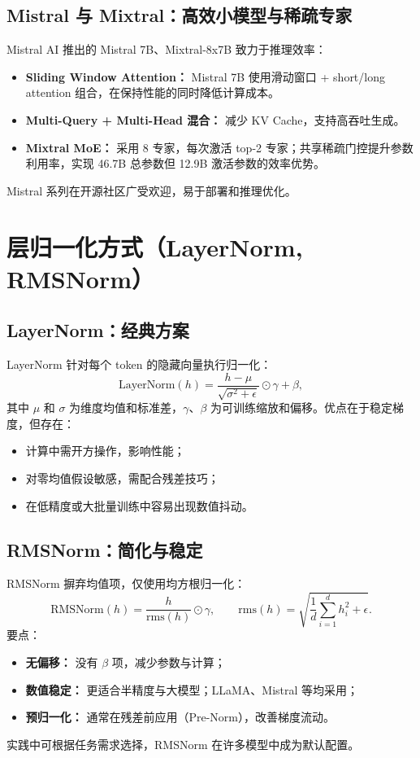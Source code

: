 \documentclass[UTF8,zihao=-4]{ctexart}
\begin{document}
\subsection{Mistral 与 Mixtral：高效小模型与稀疏专家}
Mistral AI 推出的 Mistral 7B、Mixtral-8x7B 致力于推理效率：
\begin{itemize}
  \item \textbf{Sliding Window Attention：} Mistral 7B 使用滑动窗口 + short/long attention 组合，在保持性能的同时降低计算成本。
  \item \textbf{Multi-Query + Multi-Head 混合：} 减少 KV Cache，支持高吞吐生成。
  \item \textbf{Mixtral MoE：} 采用 8 专家，每次激活 top-2 专家；共享稀疏门控提升参数利用率，实现 46.7B 总参数但 12.9B 激活参数的效率优势。
\end{itemize}
Mistral 系列在开源社区广受欢迎，易于部署和推理优化。

\section{层归一化方式（LayerNorm, RMSNorm）}
\subsection{LayerNorm：经典方案}
LayerNorm 针对每个 token 的隐藏向量执行归一化：
\begin{equation}
  \mathrm{LayerNorm}(h) = \frac{h - \mu}{\sqrt{\sigma^2 + \epsilon}} \odot \gamma + \beta,
\end{equation}
其中 $\mu$ 和 $\sigma$ 为维度均值和标准差，$\gamma$、$\beta$ 为可训练缩放和偏移。优点在于稳定梯度，但存在：
\begin{itemize}
  \item 计算中需开方操作，影响性能；
  \item 对零均值假设敏感，需配合残差技巧；
  \item 在低精度或大批量训练中容易出现数值抖动。
\end{itemize}

\subsection{RMSNorm：简化与稳定}
RMSNorm 摒弃均值项，仅使用均方根归一化：
\begin{equation}
  \mathrm{RMSNorm}(h) = \frac{h}{\mathrm{rms}(h)} \odot \gamma, \qquad \mathrm{rms}(h) = \sqrt{\frac{1}{d} \sum_{i=1}^{d} h_i^2 + \epsilon}.
\end{equation}
要点：
\begin{itemize}
  \item \textbf{无偏移：} 没有 $\beta$ 项，减少参数与计算；
  \item \textbf{数值稳定：} 更适合半精度与大模型；LLaMA、Mistral 等均采用；
  \item \textbf{预归一化：} 通常在残差前应用（Pre-Norm），改善梯度流动。
\end{itemize}
实践中可根据任务需求选择，RMSNorm 在许多模型中成为默认配置。
\end{document}
